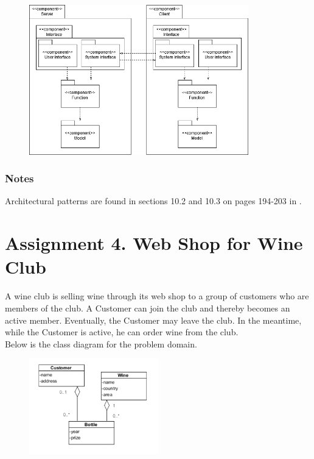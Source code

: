 \begin{figure}[H]
    \centering
    \includegraphics[width=0.85\textwidth]{figures/assignment3-4componentarchitecture2018.png}
\end{figure}

\subsubsection*{Notes}
Architectural patterns are found in sections 10.2 and 10.3 on pages 194-203 in \ad. 

\section{Assignment 4. Web Shop for Wine Club}
A wine club is selling wine through its web shop to a group of customers who are members of the club. A Customer can join the club and thereby becomes an active member. Eventually, the Customer may leave the club. In the meantime, while the Customer is active, he can order wine from the club. \\
Below is the class diagram for the problem domain. 

\begin{figure}[H]
    \centering
    \includegraphics[width=0.5\textwidth]{figures/assignment4classdiagram2018.png}
\end{figure}

